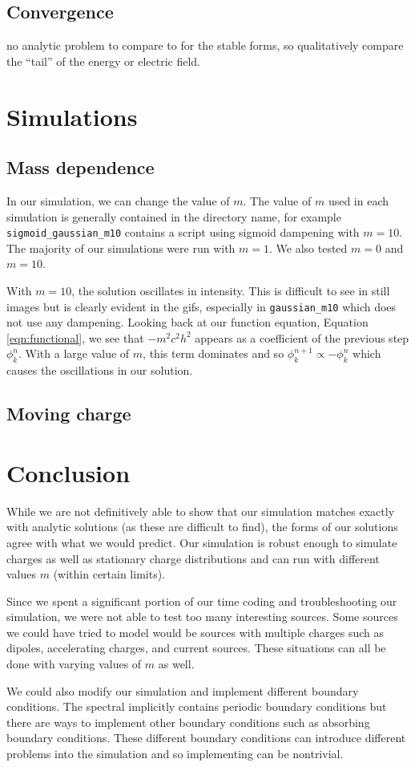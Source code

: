 \documentclass{article}
\begin{document}
	
	\subsection{Convergence} no analytic problem to compare to for the stable forms, so qualitatively compare the ``tail'' of the energy or electric field.
	
	\section{Simulations}
	
	\subsection{Mass dependence}
	In our simulation, we can change the value of $m$. The value of $m$ used in each simulation is generally contained in the directory name, for example \texttt{sigmoid\_gaussian\_m10} contains a script using sigmoid dampening with $m=10$. The majority of our simulations were run with $m=1$. We also tested $m=0$ and $m=10$. 
	
	With $m=10$, the solution oscillates in intensity. This is difficult to see in still images but is clearly evident in the gifs, especially in \texttt{gaussian\_m10} which does not use any dampening. Looking back at our function equation, Equation \ref{eqn:functional}, we see that $-m^2c^2h^2$ appears as a coefficient of the previous step $\phi^n_k$. With a large value of $m$, this term dominates and so $\phi^{n+1}_k\propto-\phi^n_k$ which causes the oscillations in our solution.
	
	\subsection{Moving charge}
	
	\section{Conclusion}
	While we are not definitively able to show that our simulation matches exactly with analytic solutions (as these are difficult to find), the forms of our solutions agree with what we would predict. Our simulation is robust enough to simulate charges as well as stationary charge distributions and can run with different values $m$ (within certain limits). 
	
	Since we spent a significant portion of our time coding and troubleshooting our simulation, we were not able to test too many interesting sources. Some sources we could have tried to model would be sources with multiple charges such as dipoles, accelerating charges, and current sources. These situations can all be done with varying values of $m$ as well.

	We could also modify our simulation and implement different boundary conditions. The spectral implicitly contains periodic boundary conditions but there are ways to implement other boundary conditions such as absorbing boundary conditions. These different boundary conditions can introduce different problems into the simulation and so implementing can be nontrivial.
	
\end{document}
